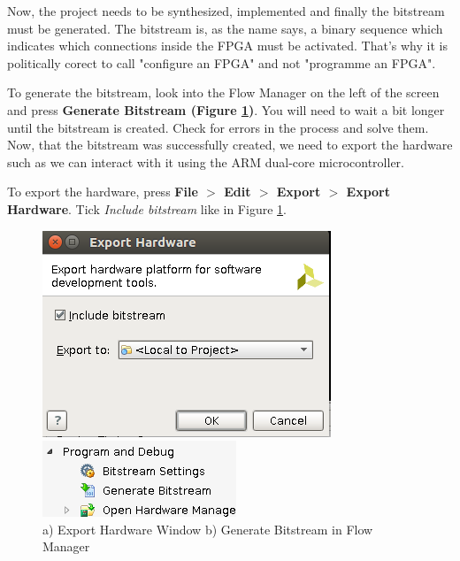 \documentclass[portrait, margin=0.3in]{article}
\begin{document}
\begin{enumerate}
Now, the project needs to be synthesized, implemented and finally the bitstream must 
be generated.
The bitstream is, as the name says, a binary sequence which indicates which connections inside the FPGA must be activated. That's why it is politically corect to call "configure an FPGA" and not "programme an FPGA".

To generate the bitstream, look into the Flow Manager on the left of the screen and press \textbf{Generate Bitstream (Figure \ref{fig:export_hardware_generate_bitstream})}. You will need to wait a bit longer until the bitstream is created. Check for errors in the process and solve them. Now, that the bitstream was successfully created, we need to export the hardware such as we can interact with it using the ARM dual-core microcontroller. 

To export the hardware, press \textbf{File $>$ Edit $>$ Export $>$ Export Hardware}. Tick \textit{Include bitstream} like in Figure \ref{fig:export_hardware_generate_bitstream}.


 \begin{figure}[h!]
\centering
\begin{minipage}{.425\textwidth}
  \centering
  \includegraphics[width=0.8\linewidth]{img/export_hardware.png}
\end{minipage}%
\begin{minipage}{.425\textwidth}
  \centering
  \includegraphics[width=0.8\linewidth]{img/generate_bitstream.png}
\end{minipage}
\caption{a) Export Hardware Window b) Generate Bitstream in Flow Manager}
\label{fig:export_hardware_generate_bitstream}
\end{figure}



\end{enumerate}
\end{document}
